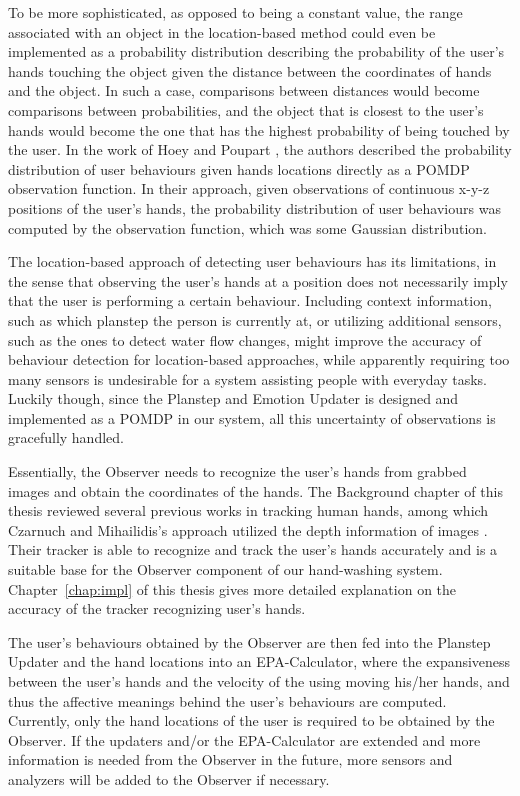 To be more sophisticated, as opposed to being a constant value, the range associated with an object in the location-based method could even be implemented as a probability distribution describing the probability of the user's hands touching the object given the distance between the coordinates of hands and the object. In such a case, comparisons between distances would become comparisons between probabilities, and the object that is closest to the user's hands would become the one that has the highest probability of being touched by the user. In the work of Hoey and Poupart \cite{hoey2005solving}, the authors described the probability distribution of user behaviours given hands locations directly as a POMDP observation function. In their approach, given observations of continuous x-y-z positions of the user's hands, the probability distribution of user behaviours was computed by the observation function, which was some Gaussian distribution.

The location-based approach of detecting user behaviours has its limitations, in the sense that observing the user's hands at a position does not necessarily imply that the user is performing a certain behaviour. Including context information, such as which planstep the person is currently at, or utilizing additional sensors, such as the ones to detect water flow changes, might improve the accuracy of behaviour detection for location-based approaches, while apparently requiring too many sensors is undesirable for a system assisting people with everyday tasks. Luckily though, since the Planstep and Emotion Updater is designed and implemented as a POMDP in our system, all this uncertainty of observations is gracefully handled.

Essentially, the Observer needs to recognize the user's hands from grabbed images and obtain the coordinates of the hands. The Background chapter of this thesis reviewed several previous works in tracking human hands, among which Czarnuch and Mihailidis's approach utilized the depth information of images \cite{czarnuch2014}. Their tracker is able to recognize and track the user's hands accurately and is a suitable base for the Observer component of our hand-washing system. Chapter~\ref{chap:impl} of this thesis gives more detailed explanation on the accuracy of the tracker recognizing user's hands.

The user's behaviours obtained by the Observer are then fed into the Planstep Updater and the hand locations into an EPA-Calculator, where the expansiveness between the user's hands and the velocity of the using moving his/her hands, and thus the affective meanings behind the user's behaviours are computed. Currently, only the hand locations of the user is required to be obtained by the Observer. If the updaters and/or the EPA-Calculator are extended and more information is needed from the Observer in the future, more sensors and analyzers will be added to the Observer if necessary.

